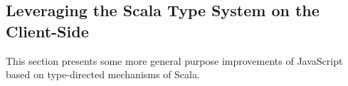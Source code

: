\documentclass[american,english,runningheads]{llncs}
\begin{document}
\subsection{Leveraging the Scala Type System on the Client-Side}

This section presents some more general purpose improvements of JavaScript based on type-directed mechanisms of
Scala.

% 
% 
% 
% 
% 
% 
% 
\end{document}
